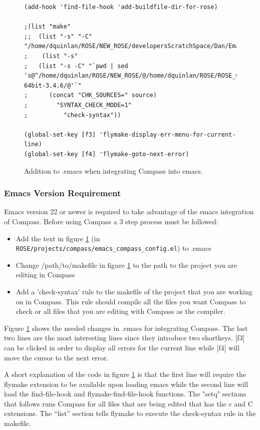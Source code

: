 \begin{figure}
{\begin{verbatim}
(add-hook 'find-file-hook 'add-buildfile-dir-for-rose)

;(list "make"
;;  (list "-s" "-C" "/home/dquinlan/ROSE/NEW_ROSE/developersScratchSpace/Dan/EmacsCompass_tests/"
;    (list "-s"
;   (list "-s -C" "`pwd | sed 's@^/home/dquinlan/ROSE/NEW_ROSE/@/home/dquinlan/ROSE/ROSE_CompileTree/LINUX-64bit-3.4.6/@'`"
;	   (concat "CHK_SOURCES=" source)
;	     "SYNTAX_CHECK_MODE=1"
;		   "check-syntax"))

(global-set-key [f3] 'flymake-display-err-menu-for-current-line)
(global-set-key [f4] 'flymake-goto-next-error)

\end{verbatim}
}
\caption{Addition to .emacs when integrating Compass into emacs. }
\label{compassEmacs}
\end{figure}

\subsubsection{Emacs Version Requirement}

Emacs version 22 or newer is required to take advantage of the emacs integration of
Compass. Before using Compass a 3 step process must be followed:
\begin{itemize}
   \item Add the text in figure \ref{compassEmacs} (in {\tt ROSE/projects/compass/emacs\_compass\_config.el}) to .emacs
   \item Change /path/to/makefile in figure \ref{compassEmacs} to the path to the project you are editing in Compass
   \item Add a 'check-syntax' rule to the makefile of the project that you are working
   on in Compass. This rule should compile all the files you want Compass to check 
   or all files that you are editing with Compass as the compiler.
\end{itemize}

Figure \ref{compassEmacs} shows the needed changes in .emacs for integrating
Compass. The last two lines are the most interesting lines since they introduce two
shortkeys. [f3] can be clicked in order to display all errors for the current line while
[f4] will move the cursor to the next error. 

A short explanation of the code in figure \ref{compassEmacs} is that the first line will require 
the flymake extension to be available upon
loading emacs while the second line will load the find-file-hook and flymake-find-file-hook
functions. The "setq" sections that follows runs Compass for all files that are being edited
that has the c and C extensions. The ``list'' section tells flymake to execute the check-syntax
rule in the makefile. 

